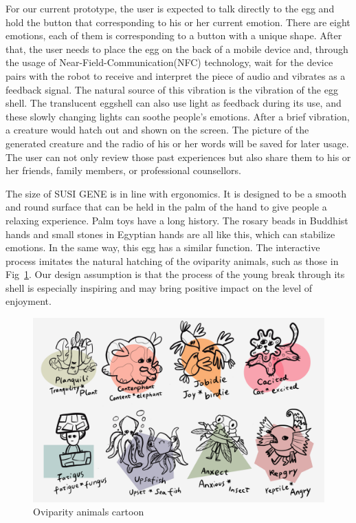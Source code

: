 \documentclass[manuscript,screen]{acmart}
\begin{document}
For our current prototype, the user is expected to talk directly to the egg and hold the button that corresponding to his or her current emotion. There are eight emotions, each of them is corresponding to a button with a unique shape. After that, the user needs to place the egg on the back of a mobile device and, through the usage of Near-Field-Communication(NFC) technology, wait for the device pairs with the robot to receive and interpret the piece of audio and vibrates as a feedback signal. The natural source of this vibration is the vibration of the egg shell. The translucent eggshell can also use light as feedback during its use, and these slowly changing lights can soothe people's emotions. After a brief vibration, a creature would hatch out and shown on the screen. The picture of the generated creature and the radio of his or her words will be saved for later usage. The user can not only review those past experiences but also share them to his or her friends, family members, or professional counsellors.

The size of SUSI GENE is in line with ergonomics. It is designed to be a smooth and round surface that can be held in the palm of the hand to give people a relaxing experience. Palm toys have a long history. The rosary beads in Buddhist hands and small stones in Egyptian hands are all like this, which can stabilize emotions. In the same way, this egg has a similar function. The interactive process imitates the natural hatching of the oviparity animals, such as those in Fig~\ref{Animals}. Our design assumption is that the process of the young break through its shell is especially inspiring and may bring positive impact on the level of enjoyment.\cite{nezlek2008regulating}

\begin{figure}[h]
  \centering
  \includegraphics[width=\linewidth]{Animals.png}
  \caption{Oviparity animals cartoon}
  \label{Animals}
\end{figure}
\end{document}
